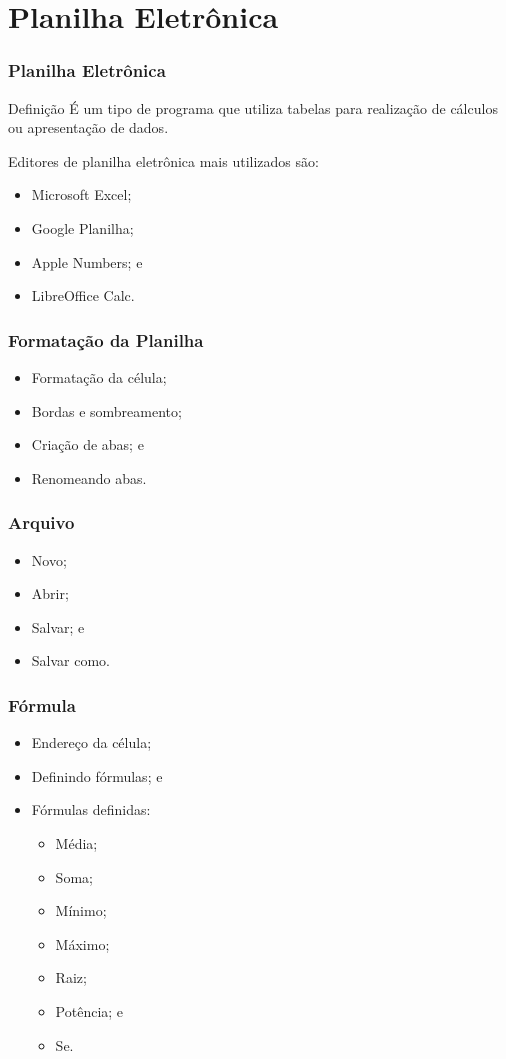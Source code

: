 \documentclass[aspectratio=169]{beamer} %
\begin{document}
\section{Planilha Eletrônica}

\begin{frame}
	\frametitle{Planilha Eletrônica}
	
	\begin{block}{Defini\c cão}
		É um tipo de programa que utiliza tabelas para realização de cálculos ou apresentação de dados.
	\end{block}\vfill
	
	Editores de planilha eletrônica mais utilizados são:
	\begin{itemize}
		\item Microsoft Excel;
		\item Google Planilha;
		\item Apple Numbers; e
		\item LibreOffice Calc.
	\end{itemize}
\end{frame}

\begin{frame}
	\frametitle{Formata\c cão da Planilha}
			
	\begin{itemize} 
		\item Formatação da célula;
		\item Bordas e sombreamento;
		\item Criação de abas; e
		\item Renomeando abas.
	\end{itemize}
\end{frame}

\begin{frame}
	\frametitle{Arquivo}
			
	\begin{itemize}
		\item Novo;
		\item Abrir;
		\item Salvar; e
		\item Salvar como.
	\end{itemize}
\end{frame}

\begin{frame}
	\frametitle{Fórmula}
			
	\begin{itemize} 
		\item Endereço da célula;
		\item Definindo fórmulas; e
		\item Fórmulas definidas:
			\begin{itemize} 
				\item Média; 
				\item Soma; 
				\item Mínimo; 
				\item Máximo; 
				\item Raiz; 
				\item Potência; e 
				\item Se.
			\end{itemize}
	\end{itemize}
\end{frame}
\end{document}
